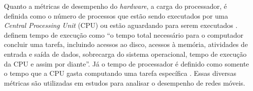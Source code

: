 Quanto a métricas de desempenho do \textit{hardware}, a carga do processador, é definida como o número de processos que estão sendo executados por uma \textit{Central Processing Unit} (CPU) ou estão aguardando para serem executados \cite{Sebastian2014}.
 definem tempo de execução como ``o tempo total necessário para o computador concluir uma tarefa, incluindo acessos ao disco, acessos à memória, atividades de entrada e saída de dados, sobrecarga do sistema operacional, tempo de execução da CPU e assim por diante''.
Já o tempo de processador é definido como somente o tempo que a CPU gasta computando uma tarefa específica \cite{Patterson2014-qv}.
Essas diversas métricas são utilizadas em estudos para analisar o desempenho de redes móveis.